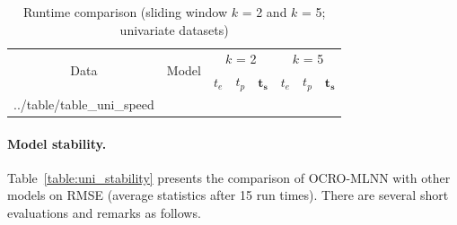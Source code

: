 \documentclass[smallcondensed, natbib]{svjour3}     %
\makeatletter
\newcommand\primitiveinput[1]
		{\@@input #1 }
\makeatother
\begin{document}
{\begin{itemize}
\end{itemize}

\begin{table}[!h]
	\caption{Runtime comparison (sliding window $k$ = 2 and $k$ = 5; univariate datasets)}
	\label{table:uni_speed}
	\centering
	\begin{adjustbox}{width=0.7\textwidth}
		\begin{tabular}{| c | c | c | c | c | c | c | c |}%
			\hline
			\multirow{2}{*}{Data} & \multirow{2}{*}{Model} & \multicolumn{3}{c|}{$k$ = 2} & \multicolumn{3}{c|}{ $k$ = 5 } \\ \cline{3-8}
   				& & $t_e$ & $t_p$ & $\boldsymbol{t_s}$ & $t_e$ & $t_p$ & $\boldsymbol{t_s}$  \\ [0.5ex] \hline
			\primitiveinput{../table/table_uni_speed}
			\hline
		\end{tabular}
	\end{adjustbox}
\end{table}

\paragraph{\textbf{Model stability.}} Table~\ref{table:uni_stability} presents the comparison of OCRO-MLNN with other models on RMSE (average statistics after 15 run times). There are several short evaluations and remarks as follows.

}
\end{document}
